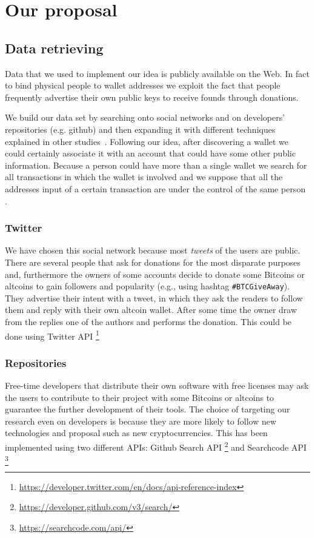 \section{Our proposal}

\subsection{Data retrieving}
Data that we used to implement our idea is publicly available on the Web. In
fact to bind physical people to wallet addresses we exploit the fact that
people frequently advertise their own public keys to receive founds
through donations.

We build our data set by searching onto social networks and on developers'
repositories (e.g. github) and then expanding it with different techniques
explained in other studies~\cite{fistful}. Following our idea, after discovering
a wallet we could certainly associate it with an account that could have some
other public information. Because a person could have more than a single wallet
we search for all transactions in which the wallet is involved and we suppose
that all the addresses input of a certain transaction are under the control of
the same person \cite{satoshi} \cite{deanon} \cite{fistful}.

\subsubsection*{Twitter}
We have chosen this social network because most \textit{tweets} of the users are
public. There are several people that ask for donations for the most disparate
purposes and, furthermore the owners of some accounts decide to donate some
Bitcoins or altcoins to gain followers and popularity (e.g., using hashtag
\texttt{\#BTCGiveAway}). They advertise their intent with a tweet, in which
they ask the readers to follow them and reply with their own altcoin wallet.
After some time the owner draw from the replies one of the authors and performs
the donation. This could be done using Twitter API
\footnote{\url{https://developer.twitter.com/en/docs/api-reference-index}}

\subsubsection*{Repositories}
Free-time developers that distribute their own software with free licenses may
ask the users to contribute to their project with some Bitcoins or altcoins to
guarantee the further development of their tools. The choice of targeting our
research even on developers is because they are more likely to follow new
technologies and proposal such as new cryptocurrencies. This has been
implemented using two different APIs: Github Search API
\footnote{\url{https://developer.github.com/v3/search/}} and Searchcode API
\footnote{\url{https://searchcode.com/api/}}

